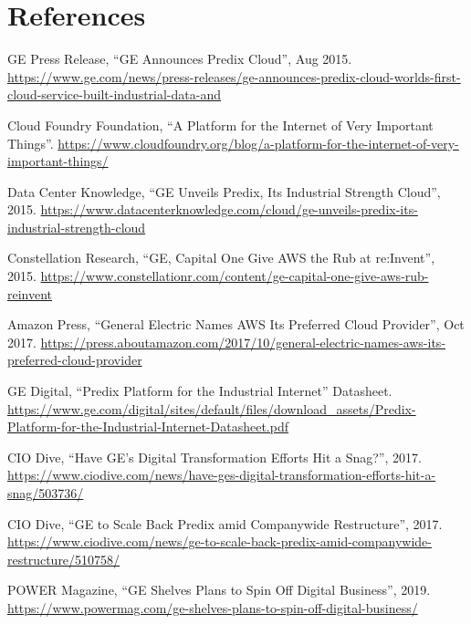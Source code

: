 \documentclass[12pt,a4paper]{article}
\begin{document}
\section*{References}
\begin{enumerate}[label={[\arabic*]},leftmargin=2.2em,itemsep=5pt]
  \item GE Press Release, ``GE Announces Predix Cloud'', Aug 2015. \url{https://www.ge.com/news/press-releases/ge-announces-predix-cloud-worlds-first-cloud-service-built-industrial-data-and}
  \item Cloud Foundry Foundation, ``A Platform for the Internet of Very Important Things''. \url{https://www.cloudfoundry.org/blog/a-platform-for-the-internet-of-very-important-things/}
  \item Data Center Knowledge, ``GE Unveils Predix, Its Industrial Strength Cloud'', 2015. \url{https://www.datacenterknowledge.com/cloud/ge-unveils-predix-its-industrial-strength-cloud}
  \item Constellation Research, ``GE, Capital One Give AWS the Rub at re:Invent'', 2015. \url{https://www.constellationr.com/content/ge-capital-one-give-aws-rub-reinvent}
  \item Amazon Press, ``General Electric Names AWS Its Preferred Cloud Provider'', Oct 2017. \url{https://press.aboutamazon.com/2017/10/general-electric-names-aws-its-preferred-cloud-provider}
  \item GE Digital, ``Predix Platform for the Industrial Internet'' Datasheet. \url{https://www.ge.com/digital/sites/default/files/download_assets/Predix-Platform-for-the-Industrial-Internet-Datasheet.pdf}
  \item CIO Dive, ``Have GE's Digital Transformation Efforts Hit a Snag?'', 2017. \url{https://www.ciodive.com/news/have-ges-digital-transformation-efforts-hit-a-snag/503736/}
  \item CIO Dive, ``GE to Scale Back Predix amid Companywide Restructure'', 2017. \url{https://www.ciodive.com/news/ge-to-scale-back-predix-amid-companywide-restructure/510758/}
  \item POWER Magazine, ``GE Shelves Plans to Spin Off Digital Business'', 2019. \url{https://www.powermag.com/ge-shelves-plans-to-spin-off-digital-business/}
\end{enumerate}
\end{document}
